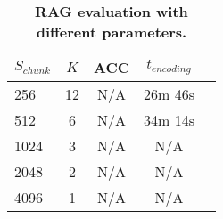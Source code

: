 \begin{table*}[ht!]
    \centering
    \begin{tabular}{lc|ccc}
      \toprule
      $S_{chunk}$ & $K$ & ACC & $t_{encoding}$ \\
      \midrule
      256  & 12 & N/A & 26m 46s \\
      512  & 6  & N/A & 34m 14s \\
      1024 & 3  & N/A & N/A \\
      2048 & 2  & N/A & N/A \\
      4096 & 1  & N/A & N/A \\
      \bottomrule
    \end{tabular}
    \caption{\textbf{RAG evaluation with different parameters.}}
    \label{tab:RAG_evaluation}
  \end{table*}
  